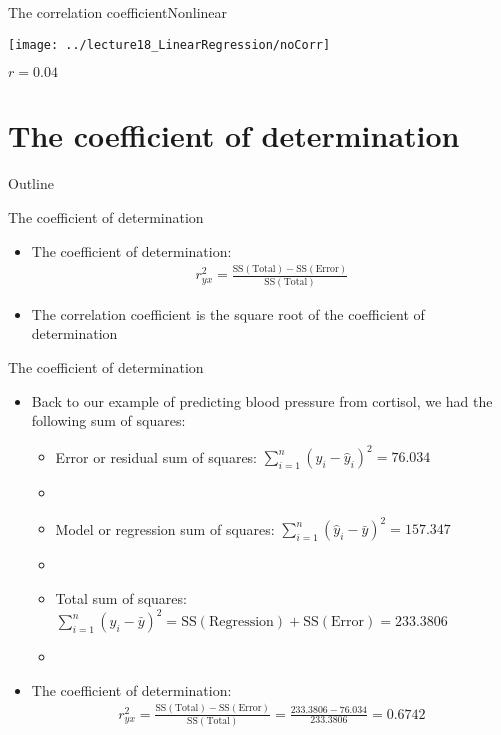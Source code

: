\documentclass[xcolor=dvipsnames]{beamer}
\begin{document}
\begin{frame}{The correlation coefficient}{Nonlinear}
	\begin{center}
		\texttt{[image: ../lecture18\_LinearRegression/noCorr]}
		
		$r = 0.04$
	\end{center}
\end{frame}

\section{The coefficient of determination}
\begin{frame}{Outline}
	\tableofcontents[currentsection,subsectionstyle=show/shaded/hide]
\end{frame}

\begin{frame}{The coefficient of determination}
	\begin{itemize}
		\item The coefficient of determination: \pause
		\begin{gather*}
		r^2_{yx} = \frac{\text{SS}(\text{Total})-\text{SS}(\text{Error})}{\text{SS}(\text{Total})}
		\end{gather*} \pause
		\item The correlation coefficient is the square root of the coefficient of determination
	\end{itemize}
\end{frame}

\begin{frame}{The coefficient of determination}
	\begin{itemize}
		\item Back to our example of predicting blood pressure from cortisol, we had the following sum of squares: \pause
		\begin{itemize}
			\item Error or residual sum of squares: $\sum_{i=1}^n (y_i - \hat{y}_i)^2=76.034$ \pause
			\item[]
			\item Model or regression sum of squares: $\sum_{i=1}^n (\hat{y}_i-\bar{y})^2=157.347$ \pause
			\item[]
			\item Total sum of squares: $\sum_{i=1}^n (y_i -\bar{y})^2 = \text{SS}(\text{Regression})+\text{SS}(\text{Error}) = 233.3806$ \pause
			\item[]
		\end{itemize}
		\item The coefficient of determination:
		\begin{gather*}
		r^2_{yx} = \frac{\text{SS}(\text{Total})-\text{SS}(\text{Error})}{\text{SS}(\text{Total})} = \frac{233.3806 - 76.034}{233.3806} = 0.6742 
		\end{gather*}
	\end{itemize}
\end{frame}
\end{document}
